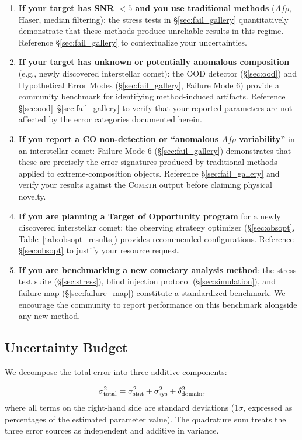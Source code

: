 \documentclass[usenatbib]{mnras}
\begin{document}
\begin{enumerate}
    \item \textbf{If your target has SNR $<5$ and you use traditional methods} ($Af\rho$, Haser, median filtering): the stress tests in \S\ref{sec:fail_gallery} quantitatively demonstrate that these methods produce unreliable results in this regime. Reference \S\ref{sec:fail_gallery} to contextualize your uncertainties.
    \item \textbf{If your target has unknown or potentially anomalous composition} (e.g., newly discovered interstellar comet): the OOD detector (\S\ref{sec:ood}) and Hypothetical Error Modes (\S\ref{sec:fail_gallery}, Failure Mode 6) provide a community benchmark for identifying method-induced artifacts. Reference \S\ref{sec:ood}--\S\ref{sec:fail_gallery} to verify that your reported parameters are not affected by the error categories documented herein.
    \item \textbf{If you report a CO non-detection or ``anomalous $Af\rho$ variability''} in an interstellar comet: Failure Mode 6 (\S\ref{sec:fail_gallery}) demonstrates that these are precisely the error signatures produced by traditional methods applied to extreme-composition objects. Reference \S\ref{sec:fail_gallery} and verify your results against the \textsc{Cometh} output before claiming physical novelty.
    \item \textbf{If you are planning a Target of Opportunity program} for a newly discovered interstellar comet: the observing strategy optimizer (\S\ref{sec:obsopt}, Table~\ref{tab:obsopt_results}) provides recommended configurations. Reference \S\ref{sec:obsopt} to justify your resource request.
    \item \textbf{If you are benchmarking a new cometary analysis method}: the stress test suite (\S\ref{sec:stress}), blind injection protocol (\S\ref{sec:simulation}), and failure map (\S\ref{sec:failure_map}) constitute a standardized benchmark. We encourage the community to report performance on this benchmark alongside any new method.
\end{enumerate}

\subsection{Uncertainty Budget}\label{sec:uncertainty_budget}

We decompose the total error into three additive components:

\begin{equation}
\sigma_{\rm total}^2 = \sigma_{\rm stat}^2 + \sigma_{\rm sys}^2 + \delta_{\rm domain}^2,
\end{equation}
where all terms on the right-hand side are standard deviations (1$\sigma$, expressed as percentages of the estimated parameter value). The quadrature sum treats the three error sources as independent and additive in variance.
\end{document}
